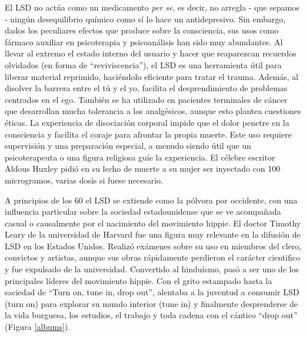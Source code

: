 El LSD no actúa como un medicamento \textit{per se}, es decir, no arregla - que sepamos - ningún desequilibrio químico como sí lo hace un antidepresivo. Sin embargo, dados los peculiares efectos que produce sobre la consciencia, sus usos como fármaco auxiliar en psicoterapia y psicoanálisis han sido muy abundantes. Al llevar al extremo el estado interno del usuario y hacer que reaparezcan recuerdos olvidados (en forma de \enquote{reviviscencia}), el LSD es una herramienta útil para liberar material reprimido, haciéndolo eficiente para tratar el trauma. Además, al disolver la barrera entre el tú y el yo, facilita el desprendimiento de problemas centrados en el ego. También se ha utilizado en pacientes terminales de cáncer que desarrollan mucha tolerancia a los analgésicos, aunque esto plantea cuestiones éticas. La experiencia de disociación corporal impide que el dolor penetre en la consciencia y facilita el coraje para afrontar la propia muerte. Este uso requiere supervisión y una preparación especial, a menudo siendo útil que un psicoterapeuta o una figura religiosa guíe la experiencia. El célebre escritor Aldous Huxley pidió en su lecho de muerte a su mujer ser inyectado con 100 microgramos, varias dosis si fuese necesario.

A principios de los 60 el LSD se extiende como la pólvora por occidente, con una influencia particular sobre la sociedad estadounidense que se ve acompañada casual o causalmente por el nacimiento del movimiento hippie. El doctor Timothy Leary de la universidad de Harvard fue una figura muy relevante en la difusión de LSD en los Estados Unidos. Realizó exámenes sobre su uso en miembros del clero, convictos y artistas, aunque sus obras rápidamente perdieron el carácter cientifico y fue expulsado de la universidad. Convertido al hinduísmo, pasó a ser uno de los principales líderes del movimiento hippie. Con el grito estampado hasta la saciedad de \enquote{Turn on, tune in, drop out}, alentaba a la juventud a consumir LSD (turn on) para explorar su mundo interior (tune in) y finalmente desprenderse de la vida burguesa, los estudios, el trabajo y toda cadena con el cántico \enquote{drop out} (Figura \ref{albums}).

